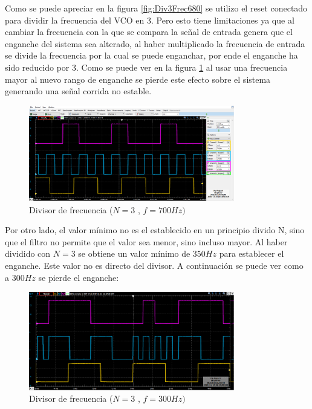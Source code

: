 \documentclass[10pt,a4paper]{article}
\begin{document}
Como se puede apreciar en la figura \ref{fig:Div3Frec680} se utilizo el reset conectado para dividir la frecuencia del VCO en 3. Pero esto tiene limitaciones ya que al cambiar la frecuencia con la que se compara la señal de entrada genera que el enganche del sistema sea alterado, al haber multiplicado la frecuencia de entrada se divide la frecuencia por la cual se puede enganchar, por ende el enganche ha sido reducido por 3. Como se puede ver en la figura \ref{fig:Div3Frec700} al usar una frecuencia mayor al nuevo rango de enganche se pierde este efecto sobre el sistema generando una señal corrida no estable.


\begin{figure}[H]
	\includegraphics[width= 0.8\textwidth]{../1. PLL/Imagenes/DIV3f700.png}
	\centering
	\caption{Divisor de frecuencia ($N=3$ , $f=700Hz)$}
	\label{fig:Div3Frec700}
\end{figure}

Por otro lado, el valor mínimo no es el establecido en un principio divido N, sino que el filtro no permite que el valor sea menor, sino incluso mayor. Al haber dividido con $N=3$ se obtiene un valor mínimo de $350Hz$ para establecer el enganche. Este valor no es directo del divisor. A continuación se puede ver como a $300Hz$ se pierde el enganche:

\begin{figure}[H]
	\includegraphics[width= 0.8\textwidth]{../1. PLL/Imagenes/DIV3f300.png}
	\centering
	\caption{Divisor de frecuencia ($N=3$ , $f=300Hz)$}
	\label{fig:Div3Frec300}
\end{figure}
\end{document}
